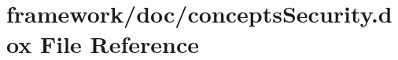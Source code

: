 \hypertarget{concepts_security_8dox}{}\section{framework/doc/concepts\+Security.dox File Reference}
\label{concepts_security_8dox}
